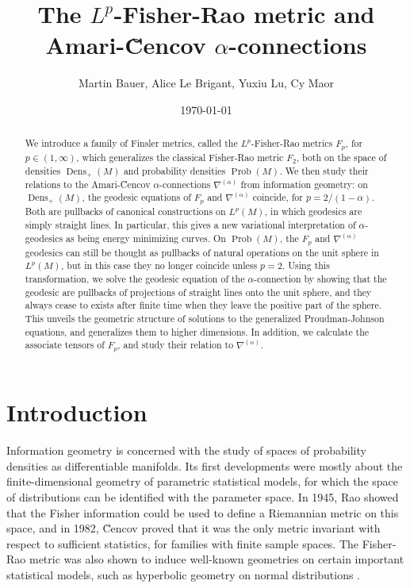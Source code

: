 \documentclass[11pt]{amsart}
\title{The $L^p$-Fisher-Rao metric and Amari-\u{C}encov $\alpha$-connections}
\author[]
{Martin Bauer, Alice Le Brigant, Yuxiu Lu, Cy Maor}
\date{\today}
\theoremstyle{definition}
\newcommand{\Prob}{\operatorname{Prob}(M)}
\newcommand{\Dens}{\operatorname{Dens}_+(M)}
\begin{document}
\begin{abstract}
We introduce a family of Finsler metrics, called the $L^p$-Fisher-Rao metrics $F_p$, for $p\in (1,\infty)$, which generalizes the classical Fisher-Rao metric $F_2$, both on the space of densities $\Dens$ and probability densities $\Prob$. 
We then study their relations to the Amari-\u{C}encov $\alpha$-connections $\nabla^{(\alpha)}$ from information geometry: on $\Dens$, the geodesic equations of $F_p$ and $\nabla^{(\alpha)}$ coincide, for $p = 2/(1-\alpha)$. 
Both are pullbacks of canonical constructions on $L^p(M)$, in which geodesics are simply straight lines.
In particular, this gives a new variational interpretation of $\alpha$-geodesics as being energy minimizing curves.
On $\Prob$, the $F_p$ and $\nabla^{(\alpha)}$ geodesics can still be thought as pullbacks of natural operations on the unit sphere in $L^p(M)$, but in this case they no longer coincide unless $p=2$. 
Using this transformation, we solve the geodesic equation of the $\alpha$-connection by showing that the geodesic are pullbacks of projections of straight lines onto the unit sphere,
and they always cease to exists after finite time when they leave the positive part of the sphere. 
This unveils the geometric structure of solutions to the generalized Proudman-Johnson equations, and generalizes them to higher dimensions.
In addition, we calculate the associate tensors of $F_p$, and study their relation to $\nabla^{(\alpha)}$.
\end{abstract}

\maketitle

\setcounter{tocdepth}{1}
\tableofcontents


\section{Introduction}
Information geometry is concerned with the study of spaces of probability densities as differentiable manifolds. Its first developments were mostly about the finite-dimensional geometry of parametric statistical models, for which the space of distributions can be identified with the parameter space. In 1945, Rao \cite{rao1945} showed that the Fisher information could be used to define a Riemannian metric on this space, and in 1982, \u{C}encov \cite{cencov1982} proved that it was the only metric invariant with respect to sufficient statistics, for families with finite sample spaces. The Fisher-Rao metric was also shown to induce well-known geometries on certain important statistical models, such as hyperbolic geometry on normal distributions \cite{atkinson1981}. 
\end{document}
